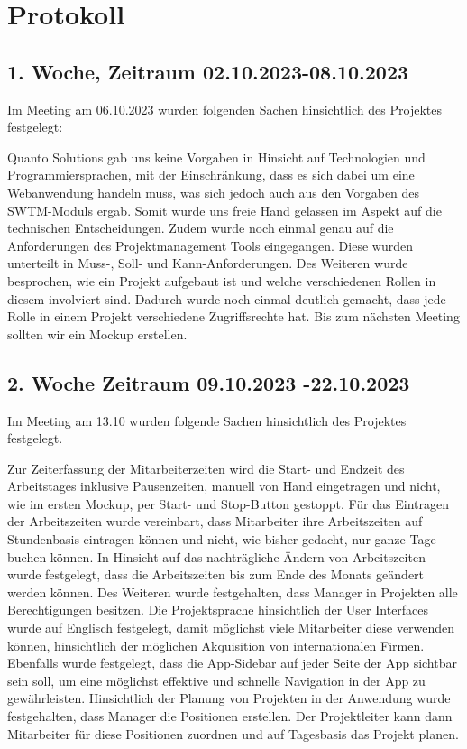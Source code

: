 \documentclass{article}
\begin{document}
\newpage

\section{Protokoll}
\subsection{1. Woche, Zeitraum 02.10.2023-08.10.2023}
Im Meeting am 06.10.2023 wurden folgenden Sachen hinsichtlich des Projektes
festgelegt:

Quanto Solutions gab uns keine Vorgaben in Hinsicht auf Technologien und
Programmiersprachen, mit der Einschränkung, dass es sich dabei um eine
Webanwendung handeln muss, was sich jedoch auch aus den Vorgaben des
SWTM-Moduls ergab. Somit wurde uns freie Hand gelassen im Aspekt auf die
technischen Entscheidungen. Zudem wurde noch einmal genau auf die Anforderungen
des Projektmanagement Tools eingegangen. Diese wurden unterteilt in Muss-,
Soll- und Kann-Anforderungen. Des Weiteren wurde besprochen, wie ein Projekt
aufgebaut ist und welche verschiedenen Rollen in diesem involviert sind.
Dadurch wurde noch einmal deutlich gemacht, dass jede Rolle in einem Projekt
verschiedene Zugriffsrechte hat. Bis zum nächsten Meeting sollten wir ein
Mockup erstellen.

\subsection{2. Woche Zeitraum 09.10.2023 -22.10.2023}
Im Meeting am 13.10 wurden folgende Sachen hinsichtlich des Projektes
festgelegt.

Zur Zeiterfassung der Mitarbeiterzeiten wird die Start- und Endzeit des
Arbeitstages inklusive Pausenzeiten, manuell von Hand eingetragen und nicht,
wie im ersten Mockup, per Start- und Stop-Button gestoppt. Für das Eintragen
der Arbeitszeiten wurde vereinbart, dass Mitarbeiter ihre Arbeitszeiten auf
Stundenbasis eintragen können und nicht, wie bisher gedacht, nur ganze Tage
buchen können. In Hinsicht auf das nachträgliche Ändern von Arbeitszeiten wurde
festgelegt, dass die Arbeitszeiten bis zum Ende des Monats geändert werden
können. Des Weiteren wurde festgehalten, dass Manager in Projekten alle
Berechtigungen besitzen. Die Projektsprache hinsichtlich der User Interfaces
wurde auf Englisch festgelegt, damit möglichst viele Mitarbeiter diese
verwenden können, hinsichtlich der möglichen Akquisition von internationalen
Firmen. Ebenfalls wurde festgelegt, dass die App-Sidebar auf jeder Seite der
App sichtbar sein soll, um eine möglichst effektive und schnelle Navigation in
der App zu gewährleisten. Hinsichtlich der Planung von Projekten in der
Anwendung wurde festgehalten, dass Manager die Positionen erstellen. Der
Projektleiter kann dann Mitarbeiter für diese Positionen zuordnen und auf
Tagesbasis das Projekt planen.
\end{document}
